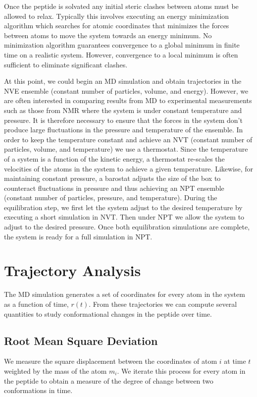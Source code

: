 Once the peptide is solvated any initial steric clashes between atoms must be allowed to relax. Typically this involves executing an energy minimization algorithm which searches for atomic coordinates that minimizes the forces between atoms to move the system towards an energy minimum. No minimization algorithm guarantees convergence to a global minimum in finite time on a realistic system. However, convergence to a local minimum is often sufficient to eliminate significant clashes. 

At this point, we could begin an MD simulation and obtain trajectories in the NVE ensemble (constant number of particles, volume, and energy). However, we are often interested in comparing results from MD to experimental measurements such as those from NMR where the system is under constant temperature and pressure. It is therefore necessary to ensure that the forces in the system don't produce large fluctuations in the pressure and temperature of the ensemble. In order to keep the temperature constant and achieve an NVT (constant number of particles, volume, and temperature) we use a thermostat. Since the temperature of a system is a function of the kinetic energy, a thermostat re-scales the velocities of the atoms in the system to achieve a given temperature. Likewise, for maintaining constant pressure, a barostat adjusts the size of the box to counteract fluctuations in pressure and thus achieving an NPT ensemble (constant number of particles, pressure, and temperature). During the equilibration step, we first let the system adjust to the desired temperature by executing a short simulation in NVT. Then under NPT we allow the system to adjust to the desired pressure. Once both equilibration simulations are complete, the system is ready for a full simulation in NPT. 

\section{Trajectory Analysis}

The MD simulation generates a set of coordinates for every atom in the system as a function of time, $r(t)$. From these trajectories we can compute several quantities to study conformational changes in the peptide over time. 

\subsection{Root Mean Square Deviation}

We measure the square displacement between the coordinates of atom $i$ at time $t$ weighted by the mass of the atom $m_i$. We iterate this process for every atom in the peptide to obtain a measure of the degree of change between two conformations in time.

